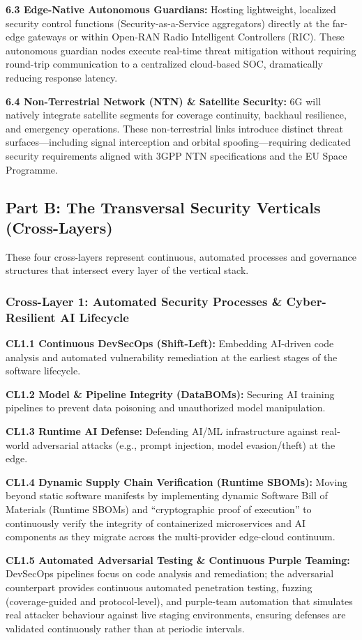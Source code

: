 \documentclass[12pt,a4paper]{article}
\begin{document}
\textbf{6.3 Edge-Native Autonomous Guardians:} Hosting lightweight, localized security control functions (Security-as-a-Service aggregators) directly at the far-edge gateways or within Open-RAN Radio Intelligent Controllers (RIC). These autonomous guardian nodes execute real-time threat mitigation without requiring round-trip communication to a centralized cloud-based SOC, dramatically reducing response latency.

\textbf{6.4 Non-Terrestrial Network (NTN) \& Satellite Security:} 6G will natively integrate satellite segments for coverage continuity, backhaul resilience, and emergency operations. These non-terrestrial links introduce distinct threat surfaces---including signal interception and orbital spoofing---requiring dedicated security requirements aligned with 3GPP NTN specifications and the EU Space Programme.

\subsection*{Part B: The Transversal Security Verticals (Cross-Layers)}
These four cross-layers represent continuous, automated processes and governance structures that intersect every layer of the vertical stack.

\subsubsection*{Cross-Layer 1: Automated Security Processes \& Cyber-Resilient AI Lifecycle}
\textbf{CL1.1 Continuous DevSecOps (Shift-Left):} Embedding AI-driven code analysis and automated vulnerability remediation at the earliest stages of the software lifecycle.

\textbf{CL1.2 Model \& Pipeline Integrity (DataBOMs):} Securing AI training pipelines to prevent data poisoning and unauthorized model manipulation.

\textbf{CL1.3 Runtime AI Defense:} Defending AI/ML infrastructure against real-world adversarial attacks (e.g., prompt injection, model evasion/theft) at the edge.

\textbf{CL1.4 Dynamic Supply Chain Verification (Runtime SBOMs):} Moving beyond static software manifests by implementing dynamic Software Bill of Materials (Runtime SBOMs) and ``cryptographic proof of execution'' to continuously verify the integrity of containerized microservices and AI components as they migrate across the multi-provider edge-cloud continuum.

\textbf{CL1.5 Automated Adversarial Testing \& Continuous Purple Teaming:} DevSecOps pipelines focus on code analysis and remediation; the adversarial counterpart provides continuous automated penetration testing, fuzzing (coverage-guided and protocol-level), and purple-team automation that simulates real attacker behaviour against live staging environments, ensuring defenses are validated continuously rather than at periodic intervals.
\end{document}
